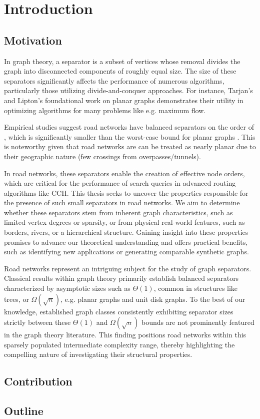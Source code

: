 \chapter{Introduction}
\label{ch:introduction}


\section{Motivation}
\label{sec:motivation}

In graph theory, a separator is a subset of vertices whose removal divides the graph into disconnected components of roughly equal size.
The size of these separators significantly affects the performance of numerous algorithms, particularly those utilizing divide-and-conquer approaches.
For instance, Tarjan's and Lipton's foundational work on planar graphs \cite{lipton_applications_1977} demonstrates their utility in optimizing algorithms for many problems like e.g. maximum flow.

Empirical studies suggest road networks have balanced separators on the order of  \cite{dibbelt_customizable_2016}, which is significantly smaller than the  worst-case bound for planar graphs \cite{lipton_separator_1979}.
This is noteworthy given that road networks are can be treated as nearly planar due to their geographic nature (few crossings from overpasses/tunnels).

In road networks, these separators enable the creation of effective node orders, which are critical for the performance of search queries in advanced routing algorithms like CCH.
This thesis seeks to uncover the properties responsible for the presence of such small separators in road networks.
We aim to determine whether these separators stem from inherent graph characteristics, such as limited vertex degrees or sparsity, or from physical real-world features, such as borders, rivers, or a hierarchical structure.
Gaining insight into these properties promises to advance our theoretical understanding and offers practical benefits, such as identifying new applications or generating comparable synthetic graphs.

Road networks represent an intriguing subject for the study of graph separators.
Classical results within graph theory primarily establish balanced separators characterized by asymptotic sizes such as \(\Theta\!\left(1\right)\), common in structures like trees, or \(\Omega\!\left(\sqrt{n}\right)\), e.g. planar graphs and unit disk graphs.
To the best of our knowledge, established graph classes consistently exhibiting separator sizes strictly between these \(\Theta\!\left(1\right)\) and \(\Omega\!\left(\sqrt{n}\right)\) bounds are not prominently featured in the graph theory literature.
This finding positions road networks within this sparsely populated intermediate complexity range, thereby highlighting the compelling nature of investigating their structural properties.

\section{Contribution}
\label{sec:Contribution}


\section{Outline}
\label{sec:overview}


